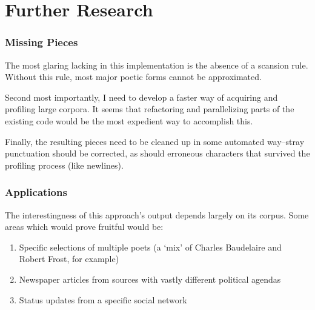 \documentclass[10pt]{article}
\begin{document}
\section{Further Research}
\subsubsection{Missing Pieces}
The most glaring lacking in this implementation is the absence of a scansion
rule. Without this rule, most major poetic forms cannot be approximated.

Second most importantly, I need to develop a faster way of acquiring and
profiling large corpora. It seems that refactoring and parallelizing parts of
the existing code would be the most expedient way to accomplish this.

Finally, the resulting pieces need to be cleaned up in some automated
way--stray punctuation should be corrected, as should erroneous characters that
survived the profiling process (like newlines).
\subsubsection{Applications}
The interestingness of this approach's output depends largely on its corpus. Some areas which would prove fruitful would be:
\onehalfspacing
\begin{enumerate}
\item Specific selections of multiple poets (a `mix' of Charles Baudelaire and Robert Frost, for example)
\item Newspaper articles from sources with vastly different political agendas
\item Status updates from a specific social network
\doublespacing
\end{enumerate}
\doublespacing



\end{document}
